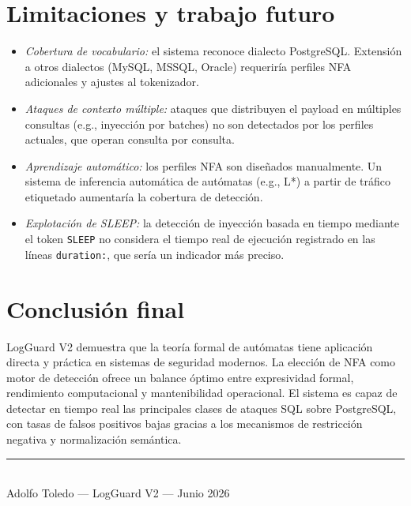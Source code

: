\documentclass[12pt, a4paper]{report}
\theoremstyle{definition}
\theoremstyle{remark}
\newcommand{\tok}[1]{\texttt{\color{codeblue}#1}}
\begin{document}
\section{Limitaciones y trabajo futuro}

\begin{itemize}
  \item \emph{Cobertura de vocabulario:} el sistema reconoce dialecto PostgreSQL.
    Extensión a otros dialectos (MySQL, MSSQL, Oracle) requeriría perfiles NFA
    adicionales y ajustes al tokenizador.
  \item \emph{Ataques de contexto múltiple:} ataques que distribuyen el payload
    en múltiples consultas (e.g., inyección por batches) no son detectados por
    los perfiles actuales, que operan consulta por consulta.
  \item \emph{Aprendizaje automático:} los perfiles NFA son diseñados manualmente.
    Un sistema de inferencia automática de autómatas (e.g., L*) a partir de
    tráfico etiquetado aumentaría la cobertura de detección.
  \item \emph{Explotación de SLEEP:} la detección de inyección basada en tiempo
    mediante el token \tok{SLEEP} no considera el tiempo real de ejecución
    registrado en las líneas \texttt{duration:}, que sería un indicador más
    preciso.
\end{itemize}

\section{Conclusión final}

LogGuard V2 demuestra que la teoría formal de autómatas tiene aplicación
directa y práctica en sistemas de seguridad modernos. La elección de NFA como
motor de detección ofrece un balance óptimo entre expresividad formal,
rendimiento computacional y mantenibilidad operacional. El sistema es capaz de
detectar en tiempo real las principales clases de ataques SQL sobre PostgreSQL,
con tasas de falsos positivos bajas gracias a los mecanismos de restricción
negativa y normalización semántica.

\bigskip
\begin{center}
\rule{8cm}{0.4pt}\\[0.3cm]
{\small Adolfo Toledo — LogGuard V2 — Junio 2026}
\end{center}

\end{document}
